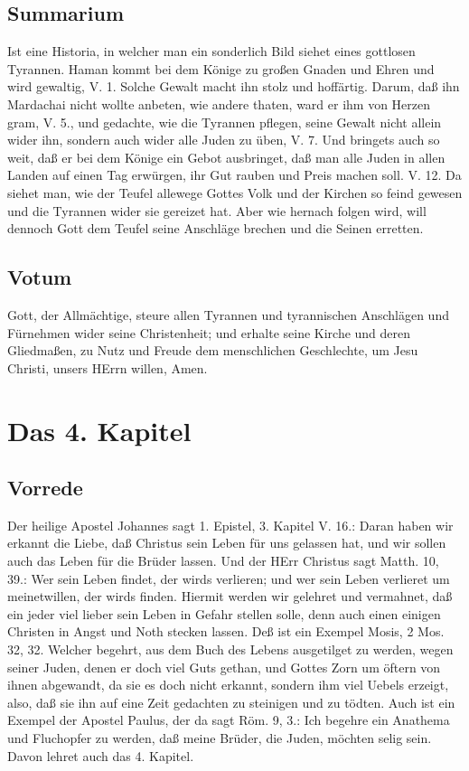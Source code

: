 
\section{Summarium}

Ist eine Historia, in welcher man ein sonderlich Bild siehet eines gottlosen Tyrannen. Haman kommt bei dem Könige zu großen Gnaden und Ehren und wird gewaltig, V. 1. Solche Gewalt macht ihn stolz und hoffärtig. Darum, daß ihn Mardachai nicht wollte anbeten, wie andere thaten, ward er ihm von Herzen gram, V. 5., und gedachte, wie die Tyrannen pflegen, seine Gewalt nicht allein wider ihn, sondern auch wider alle Juden zu üben, V. 7. Und bringets auch so weit, daß er bei dem Könige ein Gebot ausbringet, daß man alle Juden in allen Landen auf einen Tag erwürgen, ihr Gut rauben und Preis machen soll. V. 12. Da siehet man, wie der Teufel allewege Gottes Volk und der Kirchen so feind gewesen und die Tyrannen wider sie gereizet hat. Aber wie hernach folgen wird, will dennoch Gott dem Teufel seine Anschläge brechen und die Seinen erretten.

\section{Votum}

Gott, der Allmächtige, steure allen Tyrannen und tyrannischen Anschlägen und Fürnehmen wider seine Christenheit; und erhalte seine Kirche und deren Gliedmaßen, zu Nutz und Freude dem menschlichen Geschlechte, um Jesu Christi, unsers HErrn willen, Amen.

\chapter{Das 4. Kapitel}

\section{Vorrede}

Der heilige Apostel Johannes sagt 1. Epistel, 3. Kapitel V. 16.: Daran haben wir erkannt die Liebe, daß Christus sein Leben für uns gelassen hat, und wir sollen auch das Leben für die Brüder lassen. Und der HErr Christus sagt Matth. 10, 39.: Wer sein Leben findet, der wirds verlieren; und wer sein Leben verlieret um meinetwillen, der wirds finden. Hiermit werden wir gelehret und vermahnet, daß ein jeder viel lieber sein Leben in Gefahr stellen solle, denn auch einen einigen Christen in Angst und Noth stecken lassen. Deß ist ein Exempel Mosis, 2 Mos. 32, 32. Welcher begehrt, aus dem Buch des Lebens ausgetilget zu werden, wegen seiner Juden, denen er doch viel Guts gethan, und Gottes Zorn um öftern von ihnen abgewandt, da sie es doch nicht erkannt, sondern ihm viel Uebels erzeigt, also, daß sie ihn auf eine Zeit gedachten zu steinigen und zu tödten. Auch ist ein Exempel der Apostel Paulus, der da sagt Röm. 9, 3.: Ich begehre ein Anathema und Fluchopfer zu werden, daß meine Brüder, die Juden, möchten selig sein. Davon lehret auch das 4. Kapitel.

